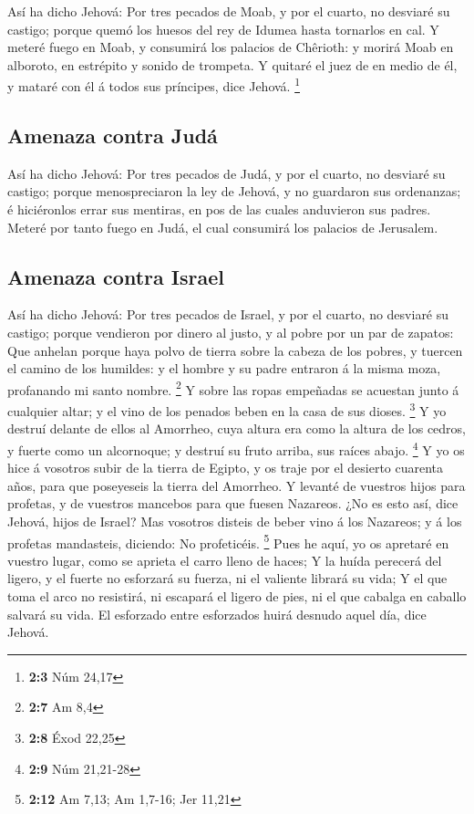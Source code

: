  Así ha dicho Jehová: Por tres pecados de Moab, y por el
cuarto, no desviaré su castigo; porque quemó los huesos del rey de
Idumea hasta tornarlos en cal.  Y meteré fuego en Moab, y
consumirá los palacios de Chêrioth: y morirá Moab en alboroto, en
estrépito y sonido de trompeta.  Y quitaré el juez de en
medio de él, y mataré con él á todos sus príncipes, dice Jehová.
\footnote{\textbf{2:3} Núm 24,17}

\hypertarget{amenaza-contra-juduxe1}{%
\subsection{Amenaza contra Judá}\label{amenaza-contra-juduxe1}}

 Así ha dicho Jehová: Por tres pecados de Judá, y por el
cuarto, no desviaré su castigo; porque menospreciaron la ley de Jehová,
y no guardaron sus ordenanzas; é hiciéronlos errar sus mentiras, en pos
de las cuales anduvieron sus padres.  Meteré por tanto
fuego en Judá, el cual consumirá los palacios de Jerusalem.

\hypertarget{amenaza-contra-israel}{%
\subsection{Amenaza contra Israel}\label{amenaza-contra-israel}}

 Así ha dicho Jehová: Por tres pecados de Israel, y por el
cuarto, no desviaré su castigo; porque vendieron por dinero al justo, y
al pobre por un par de zapatos:  Que anhelan porque haya
polvo de tierra sobre la cabeza de los pobres, y tuercen el camino de
los humildes: y el hombre y su padre entraron á la misma moza,
profanando mi santo nombre. \footnote{\textbf{2:7} Am 8,4}
 Y sobre las ropas empeñadas se acuestan junto á cualquier
altar; y el vino de los penados beben en la casa de sus dioses.
\footnote{\textbf{2:8} Éxod 22,25}  Y yo destruí delante
de ellos al Amorrheo, cuya altura era como la altura de los cedros, y
fuerte como un alcornoque; y destruí su fruto arriba, sus raíces abajo.
\footnote{\textbf{2:9} Núm 21,21-28}  Y yo os hice á
vosotros subir de la tierra de Egipto, y os traje por el desierto
cuarenta años, para que poseyeseis la tierra del Amorrheo.
 Y levanté de vuestros hijos para profetas, y de vuestros
mancebos para que fuesen Nazareos. ¿No es esto así, dice Jehová, hijos
de Israel?  Mas vosotros disteis de beber vino á los
Nazareos; y á los profetas mandasteis, diciendo: No profeticéis.
\footnote{\textbf{2:12} Am 7,13; Am 1,7-16; Jer 11,21} 
Pues he aquí, yo os apretaré en vuestro lugar, como se aprieta el carro
lleno de haces;  Y la huída perecerá del ligero, y el
fuerte no esforzará su fuerza, ni el valiente librará su vida;
 Y el que toma el arco no resistirá, ni escapará el
ligero de pies, ni el que cabalga en caballo salvará su vida.
 El esforzado entre esforzados huirá desnudo aquel día,
dice Jehová.

